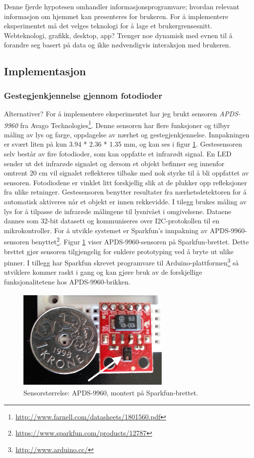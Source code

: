 Denne fjerde hypotesen omhandler informasjonsprogramvare; hvordan relevant informasjon om hjemmet kan presenteres for brukeren. For å implementere eksperimentet må det velges teknologi for å lage et brukergrensesnitt. Webteknologi, grafikk, desktop, app? Trenger noe dynamisk med evnen til å forandre seg basert på data og ikke nødvendigvis interaksjon med brukeren.

\subsection{Implementasjon}

\subsubsection{Gestegjenkjennelse gjennom fotodioder}
{\color{red}Alternativer?} For å implementere eksperimentet har jeg brukt sensoren \emph{APDS-9960} fra Avago Technologies\footnote{\url{http://www.farnell.com/datasheets/1801560.pdf}}. Denne sensoren har flere funksjoner og tilbyr måling av lys og farge, oppdagelse av nærhet og gestegjenkjennelse. Innpakningen er svært liten på kun 3.94 * 2.36 * 1.35 mm, og kan ses i figur \ref{fig:sensor-size}. Gestesensoren selv består av fire fotodioder, som kan oppfatte et infrarødt signal. En LED sender ut det infrarøde signalet og dersom et objekt befinner seg innenfor omtrent 20 cm vil signalet reflekteres tilbake med nok styrke til å bli oppfattet av sensoren. Fotodiodene er vinklet litt forskjellig slik at de plukker opp refleksjoner fra ulike retninger. Gestesensoren benytter resultater fra nærhetsdetektoren for å automatisk aktiveres når et objekt er innen rekkevidde. I tilegg brukes måling av lys for å tilpasse de infrarøde målingene til lysnivået i omgivelsene. Dataene dannes som 32-bit datasett og kommuniseres over I2C-protokollen til en mikrokontroller. For å utvikle systemet er Sparkfun's innpakning av APDS-9960-sensoren benyttet\footnote{\url{https://www.sparkfun.com/products/12787}}. Figur \ref{fig:sensor-size} viser APDS-9960-sensoren på Sparkfun-brettet. Dette brettet gjør sensoren tilgjengelig for enklere prototyping ved å bryte ut ulike pinner. I tillegg har Sparkfun skrevet programvare til Arduino-plattformen\footnote{\url{http://www.arduino.cc/}} så utviklere kommer raskt i gang og kan gjøre bruk av de forskjellige funksjonalitetene hos APDS-9960-brikken.
\begin{figure}[h]
\centering
\includegraphics[width=7.5cm, height=5cm]{fig/sensor-size}
\caption{Sensorstørrelse: APDS-9960, montert på Sparkfun-brettet.}
\label{fig:sensor-size}
\end{figure}

